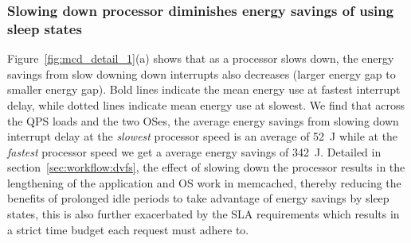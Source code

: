 \subsubsection{Slowing down processor diminishes energy savings of using sleep states}
\label{sec:mcd:slowprocvssleep}
Figure~\ref{fig:mcd_detail_1}(a) shows that as a processor slows down, the energy savings from slow downing down interrupts also decreases (larger energy gap to smaller energy gap). Bold lines indicate the mean energy use at fastest interrupt delay, while dotted lines indicate mean energy use at slowest. We find that across the QPS loads and the two OSes, the average energy savings from slowing down interrupt delay at the \textit{slowest} processor speed is an average of \SI{52}{\joule} while at the \textit{fastest} processor speed we get a average energy savings of \SI{342}{\joule}. Detailed in section~\ref{sec:workflow:dvfs}, the effect of slowing down the processor results in the lengthening of the application and OS work in memcached, thereby reducing the benefits of prolonged idle periods to take advantage of energy savings by sleep states, this is also further exacerbated by the SLA requirements which results in a strict time budget each request must adhere to. 

